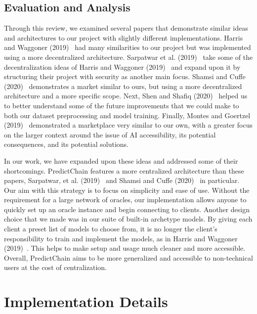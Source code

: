\documentclass{ledger}
\begin{document}
\subsection{Evaluation and Analysis}

Through this review, we examined several papers that demonstrate similar ideas and architectures to our project with
slightly different implementations.  Harris and Waggoner (2019)~\cite{sharingModels} had many similarities to our project
but was implemented using a more decentralized architecture.  Sarpatwar et al. (2019)~\cite{priceOfTrust} take some of
the decentralization ideas of Harris and Waggoner (2019)~\cite{sharingModels} and expand upon it by structuring their
project with security as another main focus.  Shamsi and Cuffe (2020)~\cite{windForcasting} demonstrates a market similar
to ours, but using a more decentralized architecture and a more specific scope.  Next, Shen and Shafiq (2020)~\cite{deepPrediction}
helped us to better understand some of the future improvements that we could make to both our dataset preprocessing
and model training.  Finally, Montes and Goertzel (2019)~\cite{democratizedAI} demonstrated a marketplace very similar
to our own, with a greater focus on the larger context around the issue of AI accessibility, its potential consequences,
and its potential solutions.

In our work, we have expanded upon these ideas and addressed some of their shortcomings.  PredictChain features a more
centralized architecture than these papers, Sarpatwar, et al. (2019)~\cite{priceOfTrust} and Shamsi and
Cuffe (2020)~\cite{windForcasting} in particular. Our aim with this strategy is to focus on simplicity and ease of use.
Without the requirement for a large network of oracles, our implementation allows anyone to quickly set up an oracle
instance and begin connecting to clients.  Another design choice that we made was in our suite of built-in archetype
models.  By giving each client a preset list of models to choose from, it is no longer the client's responsibility to
train and implement the models, as in Harris and Waggoner (2019)~\cite{sharingModels}.  This helps to make setup and
usage much cleaner and more accessible.  Overall, PredictChain aims to be more generalized and accessible to non-technical
users at the cost of centralization.

\section{Implementation Details}
\end{document}
